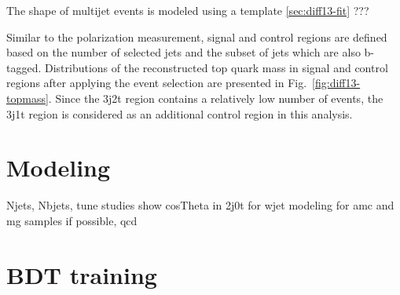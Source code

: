 The shape of multijet events is modeled using a template \ref{sec:diff13-fit} ???


Similar to the polarization measurement, signal and control regions are defined based on the number of selected jets and the subset of jets which are also b-tagged. Distributions of the reconstructed top quark mass in signal and control regions after applying the event selection are presented in Fig.~\ref{fig:diff13-topmass}. Since the 3j2t region contains a relatively low number of events, the 3j1t region is considered as an additional \ttbar control region in this analysis.

 


\section{Modeling}
\label{sec:diff13-modeling}
Njets, Nbjets, tune studies
show cosTheta in 2j0t for wjet modeling for amc and mg samples if possible, qcd


\section{BDT training}
\label{sec:diff13-bdt}

